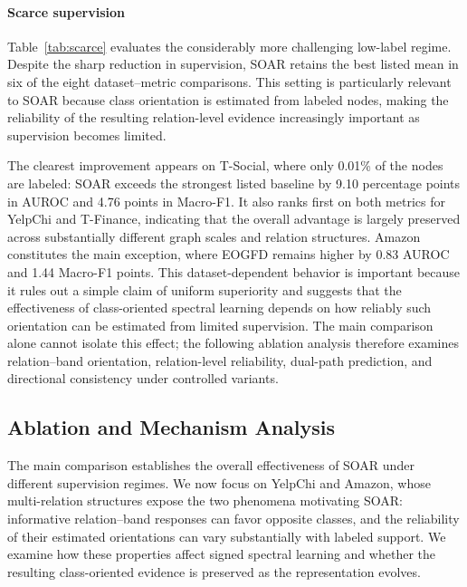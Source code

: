 \documentclass[10pt,journal]{IEEEtran}
\begin{document}
\paragraph{Scarce supervision}
Table~\ref{tab:scarce} evaluates the considerably more challenging
low-label regime. Despite the sharp reduction in supervision, SOAR retains
the best listed mean in six of the eight dataset--metric comparisons. This
setting is particularly relevant to SOAR because class orientation is
estimated from labeled nodes, making the reliability of the resulting
relation-level evidence increasingly important as supervision becomes
limited.

The clearest improvement appears on T-Social, where only 0.01\% of the
nodes are labeled: SOAR exceeds the strongest listed baseline by 9.10
percentage points in AUROC and 4.76 points in Macro-F1. It also ranks first
on both metrics for YelpChi and T-Finance, indicating that the overall
advantage is largely preserved across substantially different graph scales
and relation structures. Amazon constitutes the main exception, where
EOGFD remains higher by 0.83 AUROC and 1.44 Macro-F1 points. This
dataset-dependent behavior is important because it rules out a simple claim
of uniform superiority and suggests that the effectiveness of class-oriented
spectral learning depends on how reliably such orientation can be estimated
from limited supervision. The main comparison alone cannot isolate this
effect; the following ablation analysis therefore examines relation--band
orientation, relation-level reliability, dual-path prediction, and
directional consistency under controlled variants.

\subsection{Ablation and Mechanism Analysis}
\label{sec:analysis}
The main comparison establishes the overall effectiveness of SOAR under
different supervision regimes. We now focus on YelpChi and Amazon, whose
multi-relation structures expose the two phenomena motivating SOAR:
informative relation--band responses can favor opposite classes, and the
reliability of their estimated orientations can vary substantially with
labeled support. We examine how these properties affect signed spectral
learning and whether the resulting class-oriented evidence is preserved as
the representation evolves.
\end{document}
